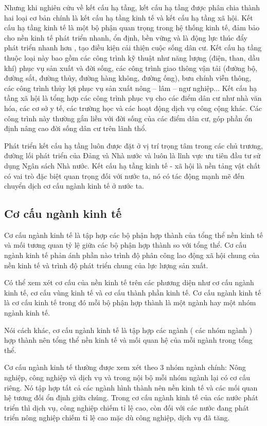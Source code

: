 Nhưng khi nghiên cứu về kết cấu hạ tầng, kết cấu hạ tầng được phân chia thành hai loại cơ bản chính là kết cấu hạ tầng kinh tế và kết cấu hạ tầng xã hội. Kết cấu hạ tầng kinh tế là một bộ phận quan trọng trong hệ thống kinh tế, đảm bảo cho nền kinh tế phát triển nhanh, ổn định, bền vững và là động lực thúc đẩy phát triển nhanh hơn , tạo điều kiện cải thiện cuộc sống dân cư. Kết cấu hạ tầng thuộc loại này bao gồm các công trình kỹ thuật như năng lượng (điện, than, dầu khí) phục vụ sản xuất và đời sống, các công trình giao thông vận tải (đường bộ, đường sắt, đường thủy, đường hàng không, đường ống), bưu chính viễn thông, các công trình thủy lợi phục vụ sản xuất nông – lâm – ngư nghiệp... Kết cấu hạ tầng xã hội là tổng hợp các công trình phục vụ cho các điểm dân cư như nhà văn hóa, các cơ sở y tế, các trường học và các hoạt động dịch vụ công cộng khác. Các công trình này thường gắn liền với đời sống của các điểm dân cư, góp phần ổn định nâng cao đời sống dân cư trên lãnh thổ.

Phát triển kết cấu hạ tầng luôn được đặt ở vị trí trọng tâm trong các chủ trương, đường lối phát triển của Đảng và Nhà nước và luôn là lĩnh vực ưu tiên đầu tư sử dụng Ngân sách Nhà nước. Kết cấu hạ tầng kinh tế - xã hội là nền tảng vật chất có vai trò đặc biệt quan trọng đối với nước ta, nó có tác động mạnh mẽ đến chuyển dịch cơ cấu ngành kinh tế ở nước ta.

\subsection{Cơ cấu ngành kinh tế}
Cơ cấu ngành kinh tế là tập hợp các bộ phận hợp thành của tổng thể nền kinh tế và mối tương quan tỷ lệ giữa các bộ phận hợp thành so với tổng thể. Cơ cấu ngành kinh tế phản ánh phần nào trình độ phân công lao động xã hội chung của nền kinh tế và trình độ phát triển chung của lực lượng sản xuất.

Có thể xem xét cơ cấu của nền kinh tế trên các phương diện như cơ cấu ngành kinh tế, cơ cấu vùng kinh tế và cơ cấu thành phần kinh tế. Cơ cấu ngành kinh tế là cơ cấu kinh tế trong đó mỗi bộ phận hợp thành là một ngành hay một nhóm ngành kinh tế.

Nói cách khác, cơ cấu ngành kinh tế là tập hợp các ngành ( các nhóm ngành ) hợp thành nên tổng thể nền kinh tế và mối quan hệ của mỗi ngành trong tổng thể.

Cơ cấu ngành kinh tế thường được xem xét theo 3 nhóm ngành chính: Nông nghiệp, công nghiệp và dịch vụ và trong nội bộ mỗi nhóm ngành lại có cơ cấu riêng. Nó tập hợp tất cả các ngành hình thành nên nền kinh tế và các mối quan hệ tương đối ổn định giữa chúng. Trong cơ cấu ngành kinh tế của các nước phát triển thì dịch vụ, công nghiệp chiếm tỉ lệ cao, còn đối với các nước đang phát triển nông nghiệp chiếm tỉ lệ cao mặc dù công nghiệp, dịch vụ đã tăng.

